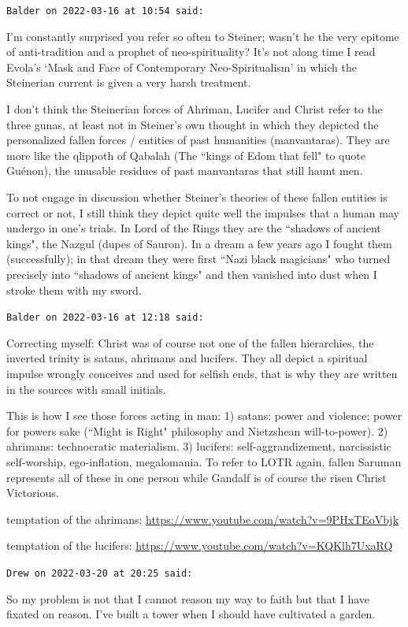 \begin{footnotesize}\begin{sffamily}



\texttt{Balder on 2022-03-16 at 10:54 said: }

I'm constantly surprised you refer so often to Steiner; wasn't he the very epitome of anti-tradition and a prophet of neo-spirituality? It's not along time I read Evola's `Mask and Face of Contemporary Neo-Spiritualism' in which the Steinerian current is given a very harsh treatment.

I don't think the Steinerian forces of Ahriman, Lucifer and Christ refer to the three gunas, at least not in Steiner's own thought in which they depicted the personalized fallen forces / entities of past humanities (manvantaras). They are more like the qlippoth of Qabalah (The ``kings of Edom that fell" to quote Guénon), the unusable residues of past manvantaras that still haunt men.

To not engage in discussion whether Steiner's theories of these fallen entities is correct or not, I still think they depict quite well the impulses that a human may undergo in one's trials. In Lord of the Rings they are the ``shadows of ancient kings", the Nazgul (dupes of Sauron). In a dream a few years ago I fought them (successfully); in that dream they were first ``Nazi black magicians" who turned precisely into ``shadows of ancient kings" and then vanished into dust when I stroke them with my sword.


\hfill

\texttt{Balder on 2022-03-16 at 12:18 said: }

Correcting myself: Christ was of course not one of the fallen hierarchies, the inverted trinity is satans, ahrimans and lucifers. They all depict a spiritual impulse wrongly conceives and used for selfish ends, that is why they are written in the sources with small initials.

This is how I see those forces acting in man: 1) satans: power and violence; power for powers sake (``Might is Right" philosophy and Nietzshean will-to-power). 2) ahrimans: technocratic materialism. 3) lucifers: self-aggrandizement, narcissistic self-worship, ego-inflation, megalomania. To refer to LOTR again, fallen Saruman represents all of these in one person while Gandalf is of course the risen Christ Victorious.

temptation of the ahrimans: \url{https://www.youtube.com/watch?v=9PHxTEoVbjk}

temptation of the lucifers: \url{https://www.youtube.com/watch?v=KQKlh7UxaRQ}


\hfill

\texttt{Drew on 2022-03-20 at 20:25 said: }

So my problem is not that I cannot reason my way to faith but that I have fixated on reason. I've built a tower when I should have cultivated a garden.


\end{sffamily}\end{footnotesize}
